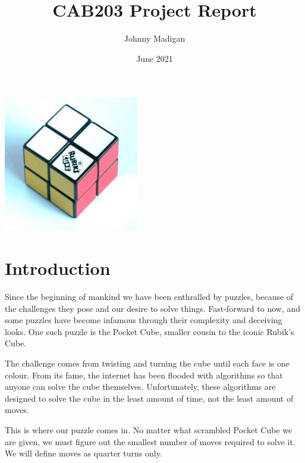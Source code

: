 \documentclass[a4paper]{article}
\begin{document}
\title{CAB203 Project Report\vspace{-3ex}}
\author{Johnny Madigan}
\date{\vspace{-3ex}June 2021\vspace{20ex}}
\maketitle
\begin{center}
\includegraphics[width=5.9cm]{rubik.jpg}
\end{center}
\newpage
\tableofcontents
\newpage

\section{Introduction}\label{sec:introduction}
\par Since the beginning of mankind we have been enthralled by puzzles, because of the challenges they pose and our desire to solve things. Fast-forward to now, and some puzzles have become infamous through their complexity and deceiving looks. One such puzzle is the Pocket Cube, smaller cousin to the iconic Rubik’s Cube.

\par The challenge comes from twisting and turning the cube until each face is one colour. From its fame, the internet has been flooded with algorithms so that anyone can solve the cube themselves. Unfortunately, these algorithms are designed to solve the cube in the least amount of time, not the least amount of moves.

\par This is where our puzzle comes in. No matter what scrambled Pocket Cube we are given, we must figure out the smallest number of moves required to solve it. We will define moves as quarter turns only.

\end{document}
